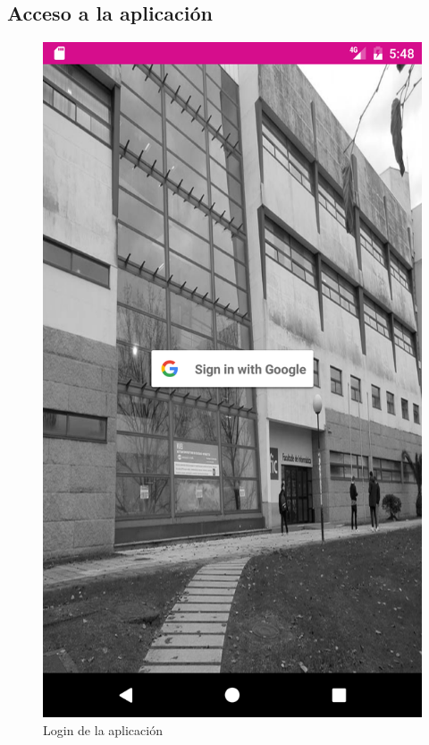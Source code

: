 \documentclass[12pt, a4paper, titlepage]{article}
\begin{document}
	\subsection{Acceso a la aplicación}
		\begin{figure}[h!]
		\begin{center}
			\includegraphics[scale=0.15]{img/login.png}
			\caption{Login de la aplicación}
		\end{center}
	\end{figure}
	
\end{document}

